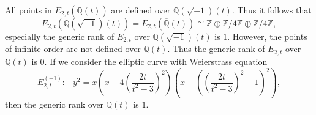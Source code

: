 \documentclass[main]{subfiles}
\begin{document}
\begin{rem}
    All points in $E_{2,t}(\overline{\mathbb{Q}}(t))$ are defined over $\mathbb{Q}(\sqrt{-1})(t)$.
    Thus it follows that
    \begin{equation*}
        E_{2,t}(\mathbb{Q}({\sqrt{-1}})(t)) = E_{2,t}(\overline{\mathbb{Q}}(t)) \cong \mathbb{Z} \oplus \mathbb{Z} / 4 \mathbb{Z} \oplus \mathbb{Z} / 4 \mathbb{Z},
    \end{equation*}
    especially the generic rank of $E_{2,t}$ over $\mathbb{Q}(\sqrt{-1})(t)$ is $1$.
    However, the points of infinite order are not defined over $\mathbb{Q}(t)$.
    Thus the generic rank of $E_{2,t}$ over $\mathbb{Q}(t)$ is $0$.
    If we consider the elliptic curve with Weierstrass equation
    \begin{equation*}
        E_{2,t}^{(-1)}: -y^{2} = x \left(x - 4 \left(\frac{2t}{t^{2} - 3} \right)^{2} \right) \left(x + \left(\left(\frac{2t}{t^{2} - 3} \right)^{2} - 1 \right)^{2} \right),
    \end{equation*}
    then the generic rank over $\mathbb{Q}(t)$ is $1$.
\end{rem}
\end{document}
